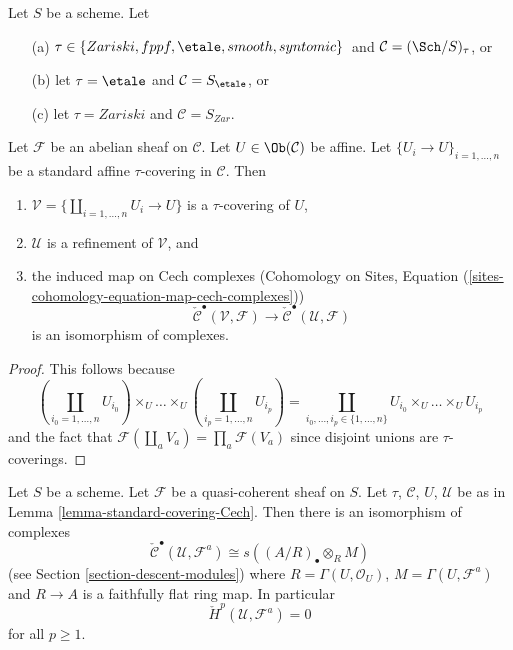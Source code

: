 \begin{lemma}
\label{lemma-standard-covering-Cech}
Let $S$ be a scheme. Let
\begin{enumerate}
\item[(a)] $\tau \in \{Zariski, \linebreak[0] fppf, \linebreak[0]
\etale, \linebreak[0] smooth, \linebreak[0] syntomic\}$\
and $\mathcal{C} = (\Sch/S)_\tau$, or
\item[(b)] let $\tau = \etale$ and $\mathcal{C} = S_\etale$, or
\item[(c)] let $\tau = Zariski$ and $\mathcal{C} = S_{Zar}$.
\end{enumerate}
Let $\mathcal{F}$ be an abelian sheaf on $\mathcal{C}$.
Let $U \in \Ob(\mathcal{C})$ be affine.
Let $\{U_i \to U\}_{i = 1, \ldots, n}$ be a standard affine
$\tau$-covering in $\mathcal{C}$. Then
\begin{enumerate}
\item $\mathcal{V} = \{\coprod_{i = 1, \ldots, n} U_i \to U\}$ is a
$\tau$-covering of $U$,
\item $\mathcal{U}$ is a refinement of $\mathcal{V}$, and
\item the induced map on Cech complexes
(Cohomology on Sites,
Equation (\ref{sites-cohomology-equation-map-cech-complexes}))
$$
\check{\mathcal{C}}^\bullet(\mathcal{V}, \mathcal{F})
\longrightarrow
\check{\mathcal{C}}^\bullet(\mathcal{U}, \mathcal{F})
$$
is an isomorphism of complexes.
\end{enumerate}
\end{lemma}

\begin{proof}
This follows because
$$
\textstyle(\coprod_{i_0 = 1, \ldots, n} U_{i_0}) \times_U
\ldots \times_U
(\coprod_{i_p = 1, \ldots, n} U_{i_p})
=
\coprod_{i_0, \ldots, i_p \in \{1, \ldots, n\}}
U_{i_0} \times_U \ldots \times_U U_{i_p}
$$
and the fact that $\mathcal{F}(\coprod_a V_a) = \prod_a \mathcal{F}(V_a)$
since disjoint unions are $\tau$-coverings.
\end{proof}

\begin{lemma}
\label{lemma-standard-covering-Cech-quasi-coherent}
Let $S$ be a scheme. Let $\mathcal{F}$ be a quasi-coherent sheaf on $S$.
Let $\tau$, $\mathcal{C}$, $U$, $\mathcal{U}$ be as in
Lemma \ref{lemma-standard-covering-Cech}. Then there is an isomorphism
of complexes
$$
\check{\mathcal{C}}^\bullet(\mathcal{U}, \mathcal{F}^a)
\cong
s((A/R)_\bullet \otimes_R M)
$$
(see Section \ref{section-descent-modules})
where $R = \Gamma(U, \mathcal{O}_U)$, $M = \Gamma(U, \mathcal{F}^a)$
and $R \to A$ is a faithfully flat ring map. In particular
$$
\check{H}^p(\mathcal{U}, \mathcal{F}^a) = 0
$$
for all $p \geq 1$.
\end{lemma}

